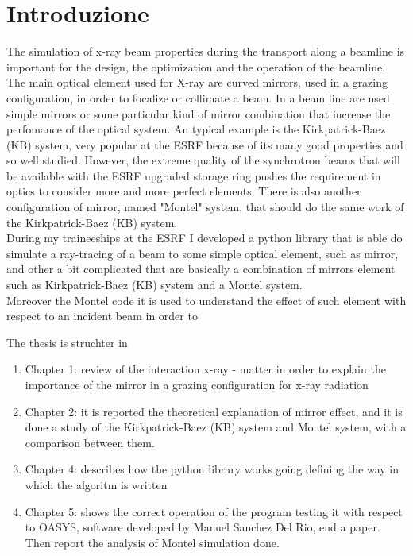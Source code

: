 %
%
\cleardoublepage
%
%
%
\chapter*{Introduzione}
%
%
\label{cap:introduzione}
%
%

The simulation of x-ray beam properties during the transport along a beamline is important for the design, the optimization and the operation of the beamline. The main optical element used for X-ray are curved mirrors, used in a grazing configuration, in order to focalize or collimate a beam. In a beam line are used simple mirrors or some particular kind of mirror combination that increase the perfomance of the optical system. An typical example is the Kirkpatrick-Baez (KB) system, very popular at the ESRF because of its many good properties and so well studied. However, the extreme quality of the synchrotron beams that will be available with the ESRF upgraded storage ring pushes the requirement in optics to consider more and more perfect elements. There is also another configuration of mirror, named "Montel" system, that should do the same work of the Kirkpatrick-Baez (KB) system.
\\
During my traineeships at the ESRF I developed a python library that is able do simulate a ray-tracing of a beam to some simple optical element, such as mirror, and other a bit complicated that are basically a combination of mirrors element such as Kirkpatrick-Baez (KB) system and a Montel system.
\\
Moreover the Montel code it is used to understand the effect of such element with respect to an incident beam in order to 

The thesis is struchter in
\begin{enumerate}
\item Chapter 1: review of the interaction x-ray - matter in order to explain the importance of the mirror in a grazing configuration for x-ray radiation
\item Chapter 2: it is reported the theoretical explanation of mirror effect, and it is done a study of the Kirkpatrick-Baez (KB) system and Montel system, with a comparison between them.
\item Chapter 4: describes how the python library works going defining the way in which the algoritm is written 
\item Chapter 5: shows the correct operation of the program testing it with respect to OASYS, software developed by Manuel Sanchez Del Rio, end a paper. Then report the analysis of Montel simulation done. 
\end{enumerate}